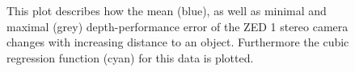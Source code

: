 \begin{figure}[h]
\begin{center}
		\caption{This plot describes how the mean (blue), as well as minimal and maximal (grey) depth-performance error of the ZED 1 stereo camera changes with increasing distance to an object. Furthermore the cubic regression function (cyan) for this data is plotted. 
		 }
	 	\label{plot:zed1Benchmark}
	\end{center}
\end{figure}
